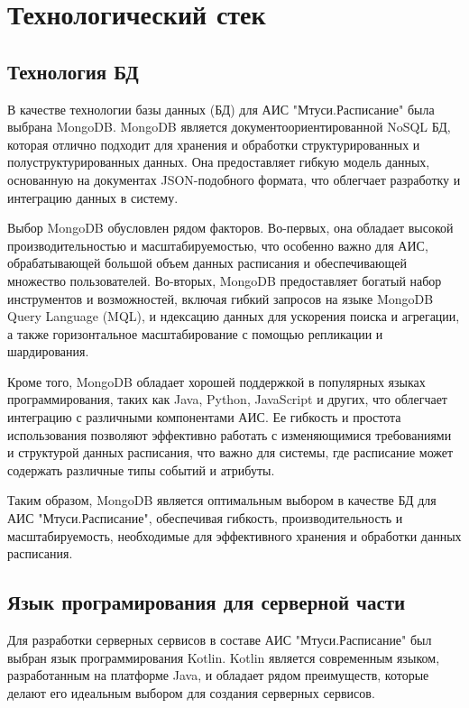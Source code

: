 \section{Технологический стек}

\subsection{Технология БД}
В качестве технологии базы данных (БД) для АИС "Мтуси.Расписание"
была выбрана MongoDB. MongoDB является документоориентированной NoSQL БД,
которая отлично подходит для хранения и
обработки структурированных и полуструктурированных данных.
Она предоставляет гибкую модель данных,
основанную на документах JSON-подобного формата,
что облегчает разработку и интеграцию данных в систему.

Выбор MongoDB обусловлен рядом факторов. Во-первых, она обладает высокой производительностью и масштабируемостью,
что особенно важно для АИС, обрабатывающей большой объем данных расписания и обеспечивающей множество пользователей.
Во-вторых, MongoDB предоставляет богатый набор инструментов и возможностей,
включая гибкий запросов на языке MongoDB Query Language (MQL), и
ндексацию данных для ускорения поиска и агрегации, а также горизонтальное
масштабирование с помощью репликации и шардирования.

Кроме того, MongoDB обладает хорошей поддержкой в популярных языках программирования,
таких как Java, Python, JavaScript и других, что облегчает интеграцию с различными компонентами АИС.
Ее гибкость и простота использования позволяют эффективно работать с изменяющимися
требованиями и структурой данных расписания, что важно для системы,
где расписание может содержать различные типы событий и атрибуты.

Таким образом, MongoDB является оптимальным выбором в
качестве БД для АИС "Мтуси.Расписание", обеспечивая гибкость, производительность
и масштабируемость, необходимые для эффективного хранения и обработки данных расписания.

\subsection{Язык програмирования для серверной части}
Для разработки серверных сервисов в составе АИС "Мтуси.Расписание" был выбран язык программирования Kotlin.
Kotlin является современным языком, разработанным на платформе Java, и обладает рядом преимуществ,
которые делают его идеальным выбором для создания серверных сервисов.

